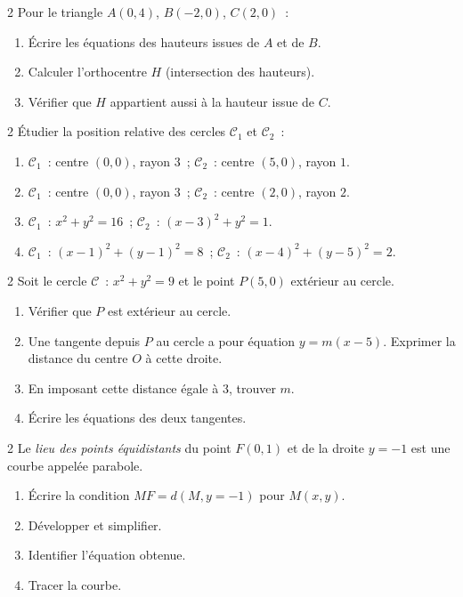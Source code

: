 \begin{exo}{2}
Pour le triangle $A(0,4)$, $B(-2,0)$, $C(2,0)$~:
\begin{enumerate}
  \item \'Ecrire les \'equations des hauteurs issues de $A$ et de $B$.
  \item Calculer l'orthocentre $H$ (intersection des hauteurs).
  \item V\'erifier que $H$ appartient aussi \`a la hauteur issue de $C$.
\end{enumerate}
\end{exo}

\begin{exo}{2}
\'Etudier la position relative des cercles $\mathcal{C}_1$ et $\mathcal{C}_2$~:
\begin{enumerate}
  \item $\mathcal{C}_1$~: centre $(0,0)$, rayon $3$~;
        $\mathcal{C}_2$~: centre $(5,0)$, rayon $1$.
  \item $\mathcal{C}_1$~: centre $(0,0)$, rayon $3$~;
        $\mathcal{C}_2$~: centre $(2,0)$, rayon $2$.
  \item $\mathcal{C}_1$~: $x^2+y^2=16$~;
        $\mathcal{C}_2$~: $(x-3)^2+y^2=1$.
  \item $\mathcal{C}_1$~: $(x-1)^2+(y-1)^2=8$~;
        $\mathcal{C}_2$~: $(x-4)^2+(y-5)^2=2$.
\end{enumerate}
\end{exo}

\begin{exo}{2}
Soit le cercle $\mathcal{C}$~: $x^2+y^2=9$ et le point $P(5,0)$
ext\'erieur au cercle.
\begin{enumerate}
  \item V\'erifier que $P$ est ext\'erieur au cercle.
  \item Une tangente depuis $P$ au cercle a pour \'equation $y=m(x-5)$.
        Exprimer la distance du centre $O$ \`a cette droite.
  \item En imposant cette distance \'egale \`a $3$, trouver $m$.
  \item \'Ecrire les \'equations des deux tangentes.
\end{enumerate}
\end{exo}

\begin{exo}{2}
Le \emph{lieu des points \'equidistants} du point $F(0,1)$ et de la droite
$y=-1$ est une courbe appel\'ee parabole.
\begin{enumerate}
  \item \'Ecrire la condition $MF = d(M, y=-1)$ pour $M(x,y)$.
  \item D\'evelopper et simplifier.
  \item Identifier l'\'equation obtenue.
  \item Tracer la courbe.
\end{enumerate}
\end{exo}

